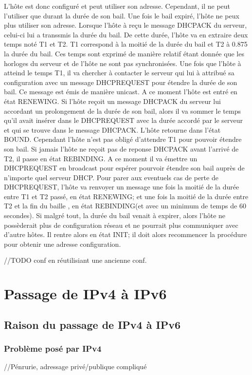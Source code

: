 \documentclass[twoside,openright,a4paper,11pt,french]{article}
\begin{document}
L'hôte est donc configuré et peut utiliser son adresse. Cependant, il ne peut l'utiliser que durant la durée de son bail. Une fois le bail expiré, l'hôte ne peux plus utiliser son adresse. Lorsque l'hôte à reçu le message DHCPACK du serveur, celui-ci lui a transsmis la durée du bail. De cette durée, l'hôte va en extraire deux temps noté T1 et T2. T1 correspond à la moitié de la durée du bail et T2 à 0.875 la durée du bail. Ces temps sont exprimé de manière relatif étant donnée que les horloges du serveur et de l'hôte ne sont pas synchronisées.
Une fois que l'hôte à atteind le temps T1, il va chercher à contacter le serveur qui lui à attribué sa configuration avec un message DHCPREQUEST pour étendre la durée de son bail. Ce message est émis de manière unicast. A ce moment l'hôte est entré en état RENEWING. Si l'hôte reçoit un message DHCPACK du serveur lui accordant un prolongement de la durée de son bail, alors il va sommer le temps qu'il avait insérer dans le DHCPREQUEST avec la durée accordé par le serveur et qui se trouve dans le message DHCPACK. L'hôte retourne dans l'état BOUND. Cependant l'hôte n'est pas obligé d'attendre T1 pour pouvoir étendre son bail.
Si jamais l'hôte ne reçoit pas de reponse DHCPACK avant l'arrivé de T2, il passe en état REBINDING. A ce moment il va émettre un DHCPREQUEST en broadcast pour espérer pourvoir étendre son bail auprès de n'importe quel serveur DHCP. Pour parer aux eventuels cas de perte de DHCPREQUEST, l'hôte va renvoyer un message une fois la moitié de la durée entre T1 et T2 passé, en état RENEWING; et une fois la moitié de la durée entre T2 et la fin du baille , en état REBINDING(et avec un minimum de temps de 60 secondes).
Si malgré tout, la durée du bail venait à expirer, alors l'hôte ne possèderait plus de configuration réseau et ne pourrait plus communiquer avec d'autre hôtes. Il rentre alors en état INIT; il doit alors recommencer la procédure pour obtenir une adresse configuration.

//TODO conf en réutilisiant une ancienne conf.



\section{Passage de IPv4 à IPv6}
\subsection{Raison du passage de IPv4 à IPv6}
\subsubsection{Problème posé par IPv4}
//Pénrurie, adressage privé/publique compliqué
\end{document}

